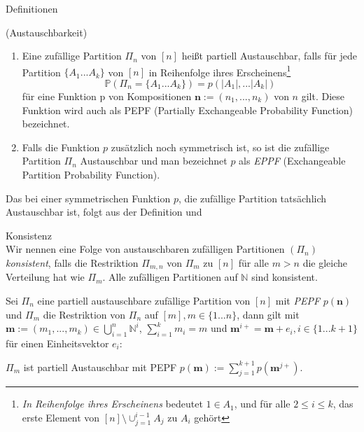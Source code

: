 \begin{section}{Definitionen}
\begin{Definition}
\end{Definition}
\begin{Definition}
    \textnormal{(Austauschbarkeit)}
    \label{Austauschbarkeit}
    \begin{enumerate}
        \item Eine zufällige Partition $\Pi_n$ von $[n]$ heißt partiell Austauschbar, falls für jede Partition $\{ A_1 ... A_k\}$ von $[n]$ in Reihenfolge ihres Erscheinens\footnote{\textit{In Reihenfolge ihres Erscheinens} bedeutet $1 \in A_1$, und für alle $2 \leq i \leq k$, das erste Element von $[n]\setminus \cup_{j=1}^{i-1}A_j$ zu $A_i$ gehört}
        \[ 
            \mathbb{P}(\Pi_n = \{ A_1 ... A_k\}) = p(|A_1|, ... |A_k|)
        \]  
        für eine Funktion p von Kompositionen $\textbf{n}:= (n_1, ..., n_k)$ von $n$ gilt. Diese Funktion wird auch als PEPF (Partially Exchangeable Probability Function) bezeichnet.
        \item Falls die Funktion $p$ zusätzlich noch symmetrisch ist, so ist die zufällige Partition $\Pi_n$ Austauschbar und man bezeichnet $p$ als \textit{EPPF} (Exchangeable Partition Probability Function).
    \end{enumerate}
\end{Definition}
\begin{Bemerkung}
    Das bei einer symmetrischen Funktion $p$, die zufällige Partition tatsächlich Austauschbar ist, folgt aus der Definition und \cite[Seite 85]{aldous2006ecole}
\end{Bemerkung}
\begin{Definition}{Konsistenz}\\
    Wir nennen eine Folge von austauschbaren zufälligen Partitionen $(\Pi_n)$ \textit{konsistent}, falls die Restriktion $\Pi_{m,n}$ von $\Pi_m$ zu $[n]$ für alle $m > n$ die gleiche Verteilung hat wie $\Pi_m$. Alle zufälligen Partitionen auf $\mathbb{N}$ sind konsistent.
\end{Definition}
\begin{lemma}
    \label{lemma partielle austauschbarkeit}
    Sei $\Pi_n$ eine partiell austauschbare zufällige Partition von $[n]$ mit \textit{PEPF} $p(\textbf{n})$ und $\Pi_m$ die Restriktion von $\Pi_n$ auf $[m], m \in \{1...n\}$, dann gilt mit $\textbf{m} := (m_1,...,m_k)\in \bigcup_{i = 1 }^{n} \mathbb{N}^i$, $\sum_{i=1}^{k}m_i = m$ und $\textbf{m}^{i+} = \textbf{m} + e_i, i \in \{1...k+1\}$ für einen Einheitsvektor $e_i$:
\begin{center} 
    $\Pi_m$ ist partiell Austauschbar mit PEPF $p(\textbf{m}):=  \sum_{j=1}^{k+1} p(\textbf{m}^{j+})$.

\end{center}
\end{lemma}
\end{section}

